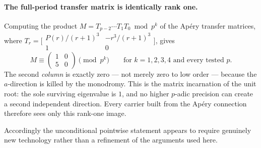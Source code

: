 \paragraph{The full-period transfer matrix is identically rank one.}  Computing the product
$M=T_{p-2}\cdots T_1T_0\bmod p^k$ of the Ap\'ery transfer matrices, where
$T_r=\bigl[\begin{smallmatrix}P(r)/(r{+}1)^3&-r^3/(r{+}1)^3\\1&0\end{smallmatrix}\bigr]$, gives
\[
  M\equiv\begin{pmatrix}1&0\\5&0\end{pmatrix}\pmod{p^k}
  \qquad\text{for }k=1,2,3,4\text{ and every tested }p.
\]
The second \emph{column} is exactly zero — not merely zero to low order — because the
$a$-direction is killed by the monodromy.  This is the matrix incarnation of the unit root:
the sole surviving eigenvalue is $1$, and no higher $p$-adic precision can create a second
independent direction.  Every carrier built from the Ap\'ery connection therefore sees only
this rank-one image.

Accordingly the unconditional pointwise statement appears to require genuinely new
technology rather than a refinement of the arguments used here.
